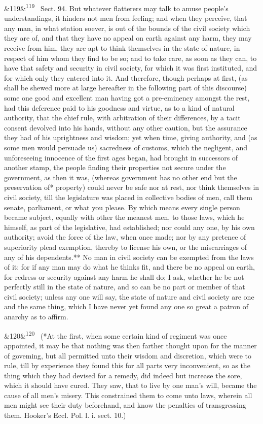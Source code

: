 \documentclass[12pt]{article}
\newcommand{\para}[1][]{\par\noindent\ifx&#1&\else\textsuperscript{\footnotesize #1}~\fi}
\begin{document}
\para[119] Sect. 94. But whatever flatterers may talk to amuse people's understandings, it hinders not men from feeling; and when they perceive, that any man, in what station soever, is out of the bounds of the civil society which they are of, and that they have no appeal on earth against any harm, they may receive from him, they are apt to think themselves in the state of nature, in respect of him whom they find to be so; and to take care, as soon as they can, to have that safety and security in civil society, for which it was first instituted, and for which only they entered into it. And therefore, though perhaps at first, (as shall be shewed more at large hereafter in the following part of this discourse) some one good and excellent man having got a pre-eminency amongst the rest, had this deference paid to his goodness and virtue, as to a kind of natural authority, that the chief rule, with arbitration of their differences, by a tacit consent devolved into his hands, without any other caution, but the assurance they had of his uprightness and wisdom; yet when time, giving authority, and (as some men would persuade us) sacredness of customs, which the negligent, and unforeseeing innocence of the first ages began, had brought in successors of another stamp, the people finding their properties not secure under the government, as then it was, (whereas government has no other end but the preservation of* property) could never be safe nor at rest, nor think themselves in civil society, till the legislature was placed in collective bodies of men, call them senate, parliament, or what you please. By which means every single person became subject, equally with other the meanest men, to those laws, which he himself, as part of the legislative, had established; nor could any one, by his own authority; avoid the force of the law, when once made; nor by any pretence of superiority plead exemption, thereby to license his own, or the miscarriages of any of his dependents.** No man in civil society can be exempted from the laws of it: for if any man may do what he thinks fit, and there be no appeal on earth, for redress or security against any harm he shall do; I ask, whether he be not perfectly still in the state of nature, and so can be no part or member of that civil society; unless any one will say, the state of nature and civil society are one and the same thing, which I have never yet found any one so great a patron of anarchy as to affirm.

\para[120] (*At the first, when some certain kind of regiment was once appointed, it may be that nothing was then farther thought upon for the manner of goveming, but all permitted unto their wisdom and discretion, which were to rule, till by experience they found this for all parts very inconvenient, so as the thing which they had devised for a remedy, did indeed but increase the sore, which it should have cured. They saw, that to live by one man's will, became the cause of all men's misery. This constrained them to come unto laws, wherein all men might see their duty beforehand, and know the penalties of transgressing them. Hooker's Eccl. Pol. l. i. sect. 10.)
\end{document}
